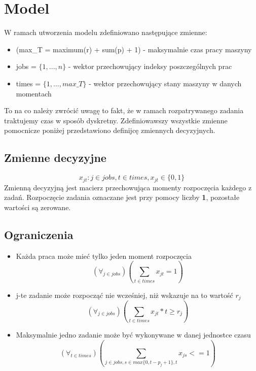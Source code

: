 \documentclass[a4paper,14pt]{report}
\begin{document}
\section{Model}
    W ramach utworzenia modelu zdefiniowano następujące zmienne:
    \begin{itemize}
        \item (max\_T = maximum(r) + sum(p) + 1) - maksymalnie czas pracy maszyny
        \item jobs = $\{1,...,n\}$ - wektor przechowujący indeksy poszczególnych prac
        \item times = $\{1,...,max\_T\}$ - wektor przechowujący stany maszyny w danych momentach 
    \end{itemize}
    To na co należy zwrócić uwagę to fakt, że w ramach rozpatrywanego zadania traktujemy czas w sposób dyskretny.
    Zdefiniowawszy wszystkie zmienne pomocnicze poniżej przedstawiono definijcę zmiennych decyzyjnych.
    \subsection{Zmienne decyzyjne}
        \begin{equation}
            x_{jt} : j \in jobs, t \in times, x_{jt} \in \{0,1\}
        \end{equation}
        Zmienną decyzyjną jest macierz przechowująca momenty rozpoczęcia każdego z zadań.
        Rozpoczęcie zadania oznaczane jest przy pomocy liczby \textbf{1}, pozostałe wartości 
        są zerowane.
    \subsection{Ograniczenia}
        \begin{itemize}
            \item Każda praca może mieć tylko jeden moment rozpoczęcia 
                \begin{equation}
                    (\forall_{j \in jobs}) (\sum_{t \in times} x_{jt} = 1 )
                \end{equation}
            \item j-te zadanie może rozpocząć nie wcześniej, niż wskazuje na to wartość $r_{j}$
                \begin{equation}
                    (\forall_{j \in jobs}) (\sum_{t \in times} x_{jt}*t \geq r_{j})
                \end{equation}
            \item Maksymalnie jedno zadanie może być wykonywane w danej jednostce czasu
                \begin{equation}
                    (\forall_{t \in times}) (\sum_{j \in jobs, s \in max\{0,t-p_{j}+1 \}, t} x_{js} <= 1)
                \end{equation}
        \end{itemize}
\end{document}
